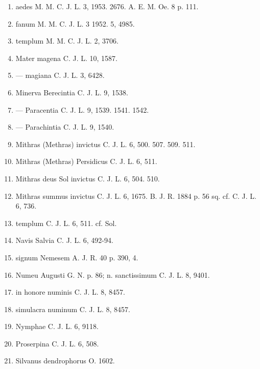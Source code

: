 \documentclass[a4paper, 11pt, oneside, polutonikogreek, german]{article}
\begin{document}
\begin{enumerate}
\item aedes M. M. C. J. L. 3, 1953. 2676. A. E. M. Oe. 8 p. 111.

\item fanum M. M. C. J. L. 3 1952. 5, 4985.

\item templum M. M. C. J. L. 2, 3706.

\item Mater magena C. J. L. 10, 1587.

\item --- magiana C. J. L. 3, 6428.

\item Minerva Berecintia C. J. L. 9, 1538.

\item --- Paracentia C. J. L. 9, 1539. 1541. 1542.

\item --- Parachintia C. J. L. 9, 1540.

\item Mithras (Methras) invictus C. J. L. 6, 500. 507. 509. 511.

\item Mithras (Methras) Persidicus C. J. L. 6, 511.

\item Mithras deus Sol invictus C. J. L. 6, 504. 510.

\item Mithras summus invictus C. J. L. 6, 1675. B. J. R. 1884 p. 56 sq. cf. C. J. L. 6, 736.

\item templum C. J. L. 6, 511. cf. Sol.

\item Navis Salvia C. J. L. 6, 492-94.

\item signum Nemesem A. J. R. 40 p. 390, 4.

\item Numeu Augusti G. N. p. 86; n. sanctissimum C. J. L. 8, 9401.

\item in honore numinis C. J. L. 8, 8457.

\item simulacra numinum C. J. L. 8, 8457.

\item Nymphae C. J. L. 6, 9118.

\item Proserpina C. J. L. 6, 508.

\item Silvanus dendrophorus O. 1602.


\end{enumerate}
\end{document}
